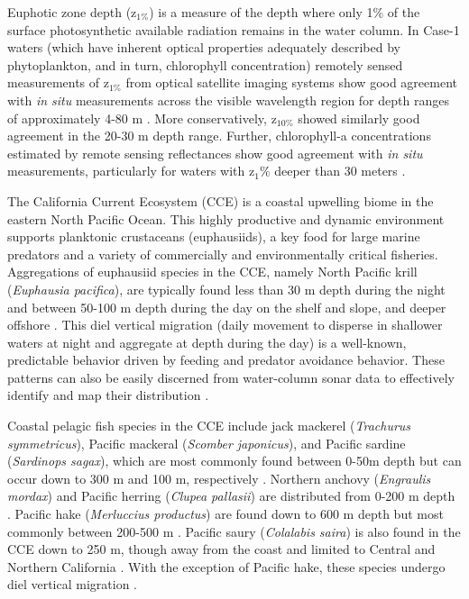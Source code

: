 \documentclass[10pt,letterpaper]{article}
\begin{document}
Euphotic zone depth (z$_{1\%}$) is a measure of the depth where only 1\% of the surface photosynthetic available radiation remains in the water column.
In Case-1 waters (which have inherent optical properties adequately described by phytoplankton, and in turn, chlorophyll concentration) remotely sensed measurements of z$_{1\%}$ from optical satellite imaging systems show good agreement with \emph{in situ} measurements across the visible wavelength region for depth ranges of approximately 4-80 m \cite{lee2007euphotic}.
More conservatively, z$_{10\%}$ showed similarly good agreement in the 20-30 m depth range.
Further, chlorophyll-a concentrations estimated by remote sensing reflectances show good agreement with \emph{in situ} measurements, particularly for waters with z$_1\%$ deeper than 30 meters \cite{lee2007euphotic}.

The California Current Ecosystem (CCE) is a coastal upwelling biome in the eastern North Pacific Ocean.
This highly productive and dynamic environment supports planktonic crustaceans (euphausiids), a key food for large marine predators and a variety of commercially and environmentally critical fisheries.
Aggregations of euphausiid species in the CCE, namely North Pacific krill (\emph{Euphausia pacifica}), are typically found less than 30 m depth during the night and between 50-100 m depth during the day on the shelf and slope, and deeper offshore \cite{ressler2005spatial}.
This diel vertical migration (daily movement to disperse in shallower waters at night and aggregate at depth during the day) is a well-known, predictable behavior driven by feeding and predator avoidance behavior.
These patterns can also be easily discerned from water-column sonar data to effectively identify and map their distribution \cite{benoit2004diel, simmonds2008fisheries, ressler2005spatial, santora2011spatial}.

Coastal pelagic fish species in the CCE include jack mackerel (\emph{Trachurus symmetricus}), Pacific mackeral (\emph{Scomber japonicus}), and Pacific sardine (\emph{Sardinops sagax}), which are most commonly found between 0-50m depth but can occur down to 300 m and 100 m, respectively \cite{demer2012prediction}.
Northern anchovy (\emph{Engraulis mordax}) and Pacific herring (\emph{Clupea pallasii}) are distributed from 0-200 m depth \cite{demer2012prediction}.
Pacific hake (\emph{Merluccius productus}) are found down to 600 m depth but most commonly between 200-500 m \cite{demer2012prediction, ressler2007pacific}.
Pacific saury (\emph{Colalabis saira}) is also found in the CCE down to 250 m, though away from the coast and limited to Central and Northern California \cite{demer2012prediction}.
With the exception of Pacific hake, these species undergo diel vertical migration \cite{demer2012prediction}.
\end{document}
